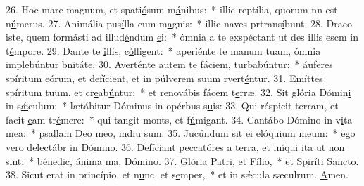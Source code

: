 26. Hoc mare magnum, et spati\uline{ó}sum m\uline{á}nibus:~* illic reptília, quorum nn est n\uline{ú}merus.
27. Animália pus\uline{í}lla cum m\uline{a}gnis:~* illic naves prtrans\uline{í}bunt.
28. Draco iste, quem formásti ad illud\uline{é}ndum \uline{e}i:~* ómnia a te exspéctant ut des illis escm in t\uline{é}mpore.
29. Dante te \uline{i}llis, c\uline{ó}lligent:~* aperiénte te manum tuam, ómnia implebúntur bnit\uline{á}te.
30. Averténte autem te fáciem, t\uline{u}rbab\uline{ú}ntur:~* áuferes spíritum eórum, et defícient, et in púlverem suum rvert\uline{é}ntur.
31. Emíttes spíritum tuum, et cr\uline{e}ab\uline{ú}ntur:~* et renovábis fácem t\uline{e}rræ.
32. Sit glória Dómin\uline{i} in s\uline{ǽ}culum:~* lætábitur Dóminus in opérbus s\uline{u}is:
33. Qui réspicit terram, et facit \uline{e}am tr\uline{é}mere:~* qui tangit monts, et f\uline{ú}migant.
34. Cantábo Dómino in v\uline{i}ta m\uline{e}a:~* psallam Deo meo, mdi\uline{u} sum.
35. Jucúndum sit ei el\uline{ó}quium m\uline{e}um:~* ego vero delectábr in D\uline{ó}mino.
36. Defíciant peccatóres a terra, et iníqui \uline{i}ta ut n\uline{o}n sint:~* bénedic, ánima ma, D\uline{ó}mino.
37. Glória P\uline{a}tri, et F\uline{í}lio,~* et Spiríti S\uline{a}ncto.
38. Sicut erat in princípio, et n\uline{u}nc, et s\uline{e}mper,~* et in sǽcula sæculrum. \uline{A}men.
